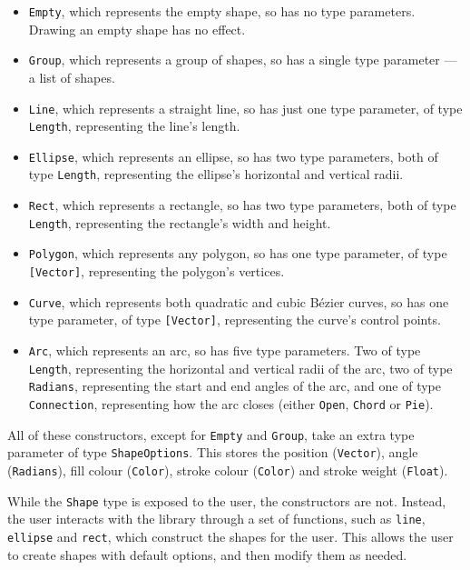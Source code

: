 \documentclass[../main.tex]{subfiles}
\begin{document}
        \begin{itemize}
            \item \verb|Empty|, which represents the empty shape, so has no type
                  parameters.
                  Drawing an empty shape has no effect.
            \item \verb|Group|, which represents a group of shapes, so has a single type
                  parameter — a list of shapes.
            \item \verb|Line|, which represents a straight line, so has just one type
                  parameter, of type \verb|Length|, representing the line's length.
            \item \verb|Ellipse|, which represents an ellipse, so has two type parameters,
                  both of type \verb|Length|, representing the ellipse's horizontal and vertical
                  radii.
            \item \verb|Rect|, which represents a rectangle, so has two type parameters, both
                  of type \verb|Length|, representing the rectangle's width and height.
            \item \verb|Polygon|, which represents any polygon, so has one type parameter, of
                  type \verb|[Vector]|, representing the polygon's vertices.
            \item \verb|Curve|, which represents both quadratic and cubic Bézier curves, so has
                  one type parameter, of type \verb|[Vector]|, representing the curve's control
                  points.
            \item \verb|Arc|, which represents an arc, so has five type parameters.
                  Two of type \verb|Length|, representing the horizontal and vertical radii of
                      the arc, two of type \verb|Radians|, representing the start and end angles of
                      the arc, and one of type \verb|Connection|, representing how the arc closes
                      (either \verb|Open|, \verb|Chord| or \verb|Pie|).
        \end{itemize}

        All of these constructors, except for \verb|Empty| and \verb|Group|, take an
            extra type parameter of type \verb|ShapeOptions|.
        This stores the position (\verb|Vector|), angle (\verb|Radians|), fill colour
            (\verb|Color|), stroke colour (\verb|Color|) and stroke weight (\verb|Float|).

        While the \verb|Shape| type is exposed to the user, the constructors are not.
        Instead, the user interacts with the library through a set of functions, such
            as \verb|line|, \verb|ellipse| and \verb|rect|, which construct the shapes for
            the user.
        This allows the user to create shapes with default options, and then modify
            them as needed.
\end{document}
